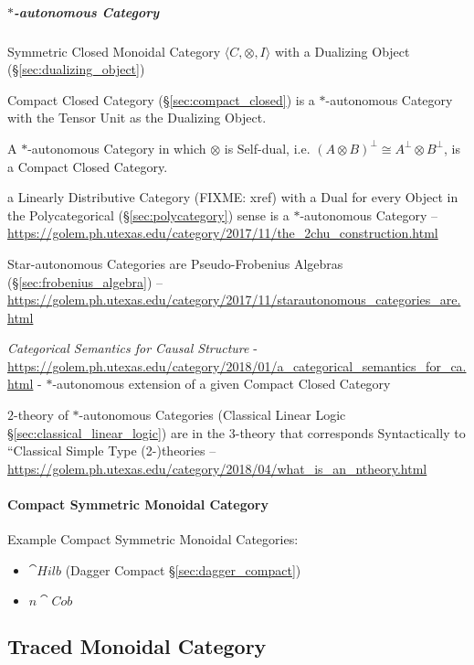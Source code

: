 \subparagraph{$*$-autonomous Category}\label{sec:star_autonomous}\hfill

Symmetric Closed Monoidal Category $\langle C, \otimes, I \rangle$
with a Dualizing Object (\S\ref{sec:dualizing_object})

Compact Closed Category (\S\ref{sec:compact_closed}) is a
$*$-autonomous Category with the Tensor Unit as the Dualizing Object.

A $*$-autonomous Category in which $\otimes$ is Self-dual, i.e. $(A
\otimes B)^\bot \cong A^\bot \otimes B^\bot$, is a Compact Closed
Category. \cite{abramsky-gay-nagarajan96}

a Linearly Distributive Category (FIXME: xref) with a Dual for every Object in
the Polycategorical (\S\ref{sec:polycategory}) sense is a $*$-autonomous
Category
--\url{https://golem.ph.utexas.edu/category/2017/11/the_2chu_construction.html}

Star-autonomous Categories are Pseudo-Frobenius Algebras
(\S\ref{sec:frobenius_algebra})
--\url{https://golem.ph.utexas.edu/category/2017/11/starautonomous_categories_are.html}

\emph{Categorical Semantics for Causal Structure} -
\url{https://golem.ph.utexas.edu/category/2018/01/a_categorical_semantics_for_ca.html}
- $*$-autonomous extension of a given Compact Closed Category

$2$-theory of $*$-autonomous Categories (Classical Linear Logic
\S\ref{sec:classical_linear_logic}) are in the $3$-theory that corresponds
Syntactically to ``Classical Simple Type (2-)theories --
\url{https://golem.ph.utexas.edu/category/2018/04/what_is_an_ntheory.html}



\paragraph{Compact Symmetric Monoidal Category}
\label{sec:compact_symmetric_monoidal}\hfill

Example Compact Symmetric Monoidal Categories:

\begin{itemize}
\item $\cat{Hilb}$ (Dagger Compact \S\ref{sec:dagger_compact})
\item $n\cat{Cob}$
\end{itemize}



\subsection{Traced Monoidal Category}\label{sec:traced_monoidal}

